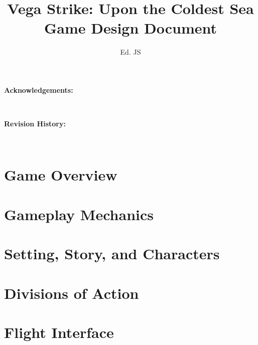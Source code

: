 

\title{Vega Strike: Upon the Coldest Sea \\ Game Design Document}

\author{Ed. JS}

\renewcommand{\thepage}{\roman{page}}
\maketitle
\renewcommand{\thepage}{\arabic{page}}
\thispagestyle{empty}
\centerline{\bf {\Huge Acknowledgements:}}
~\newline

\clearpage
\thispagestyle{empty}
\centerline{\bf {\Huge Revision History:}}
~\newline

\clearpage
\setcounter{tocdepth}{2}
\clearpage
{}
{}
\tableofcontents
\listoftables
{}
\listoffigures
{}
%

\chapter{Game Overview}


\chapter{Gameplay Mechanics}


\chapter{Setting, Story, and Characters}


\chapter{Divisions of Action}


\chapter{Flight Interface}



